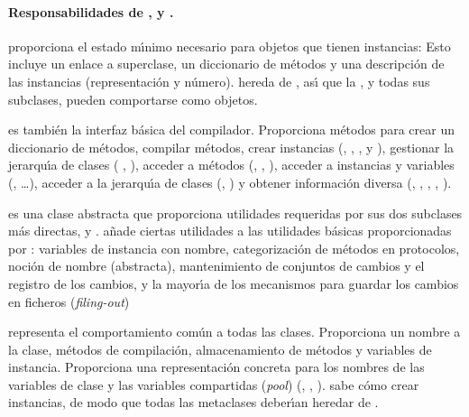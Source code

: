 \documentclass[a4paper,10pt,twoside]{book}
\begin{document}
\paragraph{Responsabilidades de ,  y .}
 proporciona el estado m\'{\i}nimo necesario para objetos que tienen instancias: Esto incluye un enlace a superclase, un diccionario de m\'etodos y una descripci\'on de las instancias (\ie representaci\'on y n\'umero).
 hereda de , as\'{\i} que la , y todas sus subclases, pueden comportarse como objetos.

 es tambi\'en la interfaz b\'asica del compilador. Proporciona m\'etodos para crear un diccionario de m\'etodos, compilar m\'etodos, crear instancias (\ie {}, , , y ), gestionar la jerarqu\'{\i}a de clases (\ie {} , ),
acceder a m\'etodos (\ie {}, , ),
acceder a instancias y variables (\ie {}, \ldots),
acceder a la jerarqu\'{\i}a de clases (\ie {}, )
y obtener informaci\'on diversa (\ie {}, , , , ).

 es una clase abstracta que proporciona utilidades requeridas por sus dos subclases m\'as directas,  y .  a\~nade ciertas utilidades a las utilidades b\'asicas proporcionadas por :
variables de instancia con nombre, categorizaci\'on de m\'etodos en protocolos, noci\'on de nombre (abstracta), mantenimiento de conjuntos de cambios y el registro de los cambios, y la mayor\'{\i}a de los mecanismos para guardar los cambios en ficheros (\emph{filing-out})

 representa el comportamiento com\'un a todas las clases.
Proporciona un nombre a la clase, m\'etodos de compilaci\'on, almacenamiento de m\'etodos y variables de instancia. Proporciona una representaci\'on concreta para los nombres de las variables de clase y las variables compartidas (\emph{pool})  (, , ).  sabe c\'omo crear instancias, de modo que todas las metaclases deber\'{\i}an heredar de .
\end{document}
